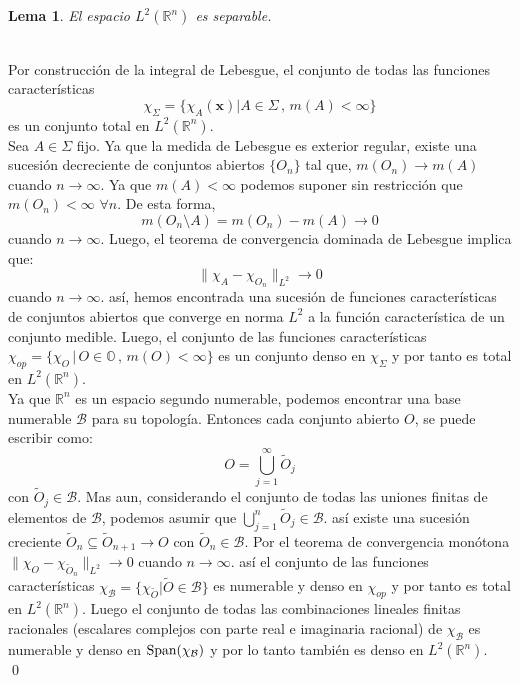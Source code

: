 \documentclass[12pt]{book}
\numberwithin{equation}{chapter}
\newtheorem{lemma}[theorem]{Lema}
\def\n{\noindent}
\def\R{\mathbb{R}}
\def\B{\mathcal{B}}
\def\rar{\rightarrow}
\def\x{\mathbf{x}}
\def\X{\chi}
\begin{document}
\begin{lemma}\label{l2-sep}
El espacio $L^{2}(\R^{n})$ es separable.
\end{lemma}
\n {\bf Demostraci\'on}\\
Por construcci\'on de la integral de Lebesgue, el conjunto de todas las funciones caracter\'isticas 
$$ \X_{\Sigma}=\{ \X_{A}(\x) | A \in \Sigma \,,\, m(A) < \infty \} $$ 
es un conjunto total en $L^{2}(\R^{n})$.\\
Sea $A \in \Sigma$ fijo. Ya que la medida de Lebesgue es exterior regular, existe una sucesi\'on decreciente de conjuntos abiertos $\{ O_{n} \}$ tal que, $ m(O_{n}) \rar m(A) $ cuando $ n \rar \infty $. Ya que $m(A) < \infty$ podemos suponer sin restricci\'on que $m(O_{n}) < \infty $ $\forall n$. De esta forma, 
$$ m(O_{n} \setminus A )= m(O_{n}) - m(A) \rar 0 $$ 
cuando $ n \rar \infty $. Luego, el teorema de convergencia dominada de Lebesgue implica que:
$$ \| \X_{A} - \X_{O_{n}} \|_{L^{2}} \rar 0 $$
cuando $ n \rar \infty $. as\'i, hemos encontrada una sucesi\'on de funciones caracter\'isticas de conjuntos abiertos que converge en norma $L^{2}$ a la funci\'on caracter\'istica de un conjunto medible. Luego, el conjunto de las funciones caracter\'isticas $ \X_{op}=\{ \X_{O} \,|\, O \in \mathbb{O} \,,\, m(O)< \infty \} $ es un conjunto denso en $\X_{\Sigma}$ y por tanto es total en $L^{2}(\R^{n})$.\\
Ya que $\R^{n}$ es un espacio segundo numerable, podemos encontrar una base numerable $\B$ para su topolog\'ia. Entonces cada conjunto abierto $O$, se puede escribir como:
$$ O= \bigcup_{j=1}^{\infty} \tilde{O}_{j} $$
con $\tilde{O}_{j} \in \B$. Mas aun, considerando el conjunto de todas las uniones finitas de elementos de $\B$, podemos asumir que $\bigcup_{j=1}^{n} \tilde{O}_{j} \in \B $. as\'i existe una sucesi\'on creciente  $ \tilde{O}_{n} \subseteq \tilde{O}_{n+1} \rar O $ con $\tilde{O}_{n} \in \B$. Por el teorema de convergencia mon\'otona $ \| \X_{O} - \X_{\tilde{O}_{n}} \|_{L^{2}} \rar 0 $ cuando $n \rar \infty$. as\'i el conjunto de las funciones caracter\'isticas $\X_{\B}= \{ \X_{\tilde{O}} | \tilde{O}\in \B  \}$ es numerable y denso en $\X_{op}$ y por tanto es total en $L^{2}(\R^{n})$. Luego el conjunto de todas las combinaciones lineales finitas racionales (escalares complejos con parte real e imaginaria racional) de $\X_{\B}$ es numerable y denso en $\hbox{Span}(\X_{\B}) $ y por lo tanto tambi\'en es denso en $ L^{2}(\R^{n}) $. \\ \qed

\vspace{5 mm}
\end{document}
